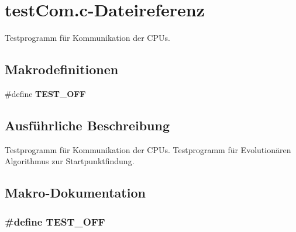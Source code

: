 \section{testCom.c-\/Dateireferenz}
\label{test_com_8c}


Testprogramm für Kommunikation der CPUs.  


\subsection*{Makrodefinitionen}
\begin{DoxyCompactItemize}
\item 
\#define {\bf TEST\_\-OFF}
\end{DoxyCompactItemize}


\subsection{Ausführliche Beschreibung}
Testprogramm für Kommunikation der CPUs. Testprogramm für Evolutionären Algorithmus zur Startpunktfindung.

\subsection{Makro-\/Dokumentation}
\subsubsection[{TEST\_\-OFF}]{\setlength{\rightskip}{0pt plus 5cm}\#define TEST\_\-OFF}\label{test_com_8c_a8f6764e8e57eabbb14922404c0e25175}
